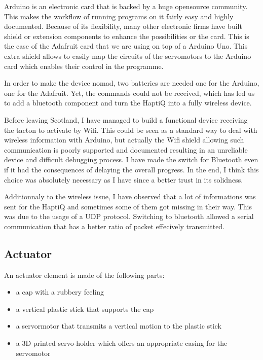 Arduino is an electronic card that is backed by a huge opensource
community. This makes the workflow of running programs on it fairly easy
and highly documented. Because of its flexibility, many other electronic
firms have built shield or extension components to enhance the
possibilities or the card. This is the case of the Adafruit card that we
are using on top of a Arduino Uno. This extra shield allows to easily
map the circuits of the servomotors to the Arduino card which enables
their control in the programme.

In order to make the device nomad, two batteries are needed one for the
Arduino, one for the Adafruit. Yet, the commands could not be received,
which has led us to add a bluetooth component and turn the HaptiQ into a
fully wireless device.

Before leaving Scotland, I have managed to build a functional device receiving the tacton to activate by Wifi. This could be seen as a standard way to deal with wireless information with Arduino, but actually the Wifi shield allowing such communication is poorly supported and documented resulting in an unreliable device and difficult debugging process. I have made the switch for Bluetooth even if it had the consequences of delaying the overall progress. In the end, I think this choice was absolutely necessary as I have since a better trust in its solidness.

Additionnaly to the wireless issue, I have observed that a lot of informations was sent for the HaptiQ and sometimes some of them got missing in their way. This was due to the usage of a UDP protocol. Switching to bluetooth allowed a serial communication that has a better ratio of packet effecively transmitted. 

\subsection{Actuator}

An actuator element is made of the following parts:

\begin{itemize}
\item
  a cap with a rubbery feeling
\item
  a vertical plastic stick that supports the cap
\item
  a servormotor that transmits a vertical motion to the plastic stick
\item
  a 3D printed servo-holder which offers an appropriate casing for the
  servomotor
\end{itemize}

